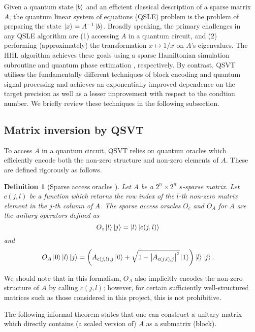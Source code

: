 \documentclass[10pt, twocolumn]{article}
\newtheorem{definition}[theorem]{Definition}
\begin{document}
Given a quantum state $\ket{b}$ and an efficient classical description of a sparse matrix $A$, the quantum linear system of equations (QSLE) problem is the problem of preparing the state $\ket{x} = A^{-1} \ket{b}$. Broadly speaking, the primary challenges in any QSLE algorithm are (1) accessing $A$ in a quantum circuit, and (2) performing (approximately) the transformation $x \mapsto 1/x$ on $A$'s eigenvalues. The HHL algorithm \cite{harrow2009quantum} achieves these goals using a sparse Hamiltonian simulation subroutine \cite{berry2007efficient} and quantum phase estimation \cite{kitaev1995quantum}, respectively. By contrast, QSVT utilises the fundamentally different techniques of block encoding \cite{gilyen2019quantum} and quantum signal processing \cite{low2017optimal} and achieves an exponentially improved dependence on the target precision as well as a lesser improvement with respect to the condtion number. We briefly review these techniques in the following subsection.

\subsection{Matrix inversion by QSVT}

To access $A$ in a quantum circuit, QSVT relies on quantum oracles which efficiently encode both the non-zero structure and non-zero elements of $A$. These are defined rigorously as follows.

\begin{definition}[Sparse access oracles \cite{camps2203explicit}]
	\label{def::sparse_access_oracles}
	Let $A$ be a $2^n \times 2^n$ $s$-sparse matrix. Let $c(j,l)$ be a function which returns the row index of the $l$-th non-zero matrix element in the $j$-th column of $A$. The sparse access oracles $O_c$ and $O_A$ for $A$ are the unitary operators defined as
	\[
		O_c \ket{l}\ket{j} = \ket{l}\ket{c(j, l)}
	\]
	and
	\[
		O_A \ket{0}\ket{l}\ket{j} = \left( A_{c(j, l), j} \ket{0} + \sqrt{1 - \abs{A_{c(j, l), j}}^2 } \ket{1} \right) \ket{l} \ket{j}.
	\]
\end{definition}

We should note that in this formalism, $O_A$ also implicitly encodes the non-zero structure of $A$ by calling $c(j, l)$; however, for certain sufficiently well-structured matrices such as those considered in this project, this is not prohibitive.

The following informal theorem states that one can construct a unitary matrix which directly contains (a scaled version of) $A$ as a submatrix (block).
\end{document}
